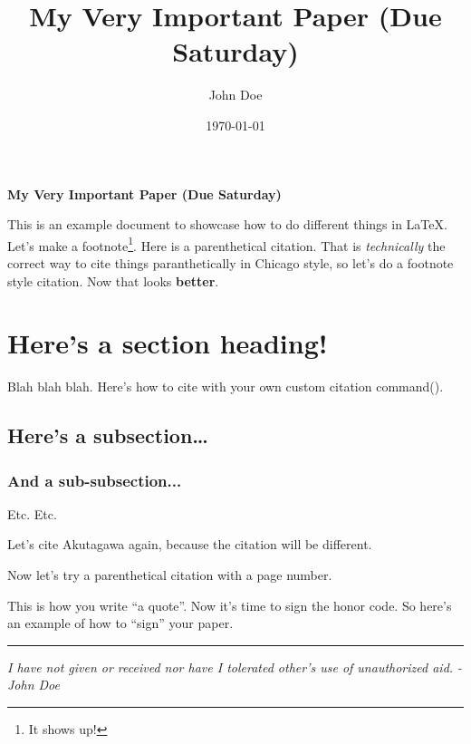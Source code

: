 \documentclass[letterpaper]{turabian-researchpaper}
\title{My Very Important Paper (Due Saturday)}
\subtitle{}
\author{John Doe}
\date{\today}
\newcommand{\ccparencite}[1]{(\citeauthor{#1})}
\begin{document}
\maketitle
\doublespacing

\begin{center}
	\textbf{My Very Important Paper (Due Saturday)}
\end{center}


This is an example document to showcase how to do different things in \LaTeX.
Let's make a footnote\footnote{It shows up!}. Here is a parenthetical citation\parencite{kant}.
That is \textit{technically} the correct way to cite things paranthetically in Chicago style, so let's
do a footnote style citation\autocite{akut, 34}. Now that looks \textbf{better}.

\section{Here's a section heading!}


Blah blah blah. Here's how to cite with your own custom citation command\ccparencite{kant, 23}.

\subsection{Here's a subsection\ldots}
\subsubsection{And a sub-subsection...}

Etc. Etc.

Let's cite Akutagawa again\autocite{akut}, because the citation will be different.

Now let's try a parenthetical citation with a page number\parencite{mill, 54}.

This is how you write ``a quote''\parencite*{akut, 84}.
Now it's time to sign the honor code. So here's an example of
how to ``sign'' your paper.

\noindent\rule{\textwidth}{1pt} %
\begin{center}
	\textit{I have not given or received nor have I tolerated other's use of unauthorized aid.}
	\newline
	\textit{- John Doe}
\end{center}

\newpage
\printbibliography
\end{document}
